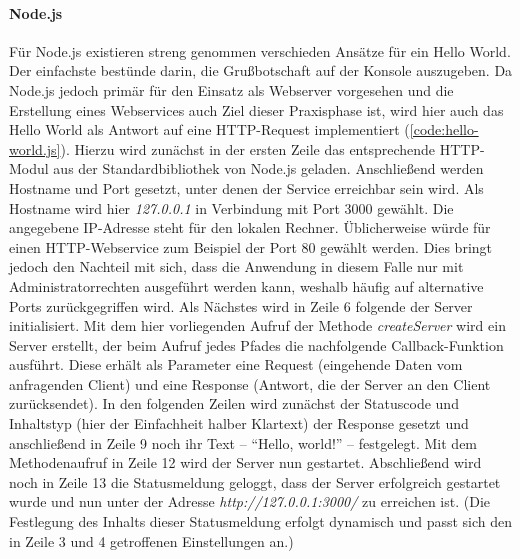 \paragraph{Node.js}
Für Node.js existieren streng genommen verschieden Ansätze für ein Hello World.
Der einfachste bestünde darin, die Grußbotschaft auf der Konsole auszugeben.
Da Node.js jedoch primär für den Einsatz als Webserver vorgesehen und die Erstellung eines Webservices auch Ziel dieser Praxisphase ist, wird hier auch das Hello World als Antwort auf eine \ac{HTTP}-Request implementiert (\autoref{code:hello-world.js}).
Hierzu wird zunächst in der ersten Zeile das entsprechende \ac{HTTP}-Modul aus der Standardbibliothek von Node.js geladen.
Anschließend werden Hostname und Port gesetzt, unter denen der Service erreichbar sein wird.
Als Hostname wird hier \emph{127.0.0.1} in Verbindung mit Port 3000 gewählt.
Die angegebene \ac{IP}-Adresse steht für den lokalen Rechner.
Üblicherweise würde für einen \ac{HTTP}-Webservice zum Beispiel der Port 80 gewählt werden.
Dies bringt jedoch den Nachteil mit sich, dass die Anwendung in diesem Falle nur mit Administratorrechten ausgeführt werden kann, weshalb häufig auf alternative Ports zurückgegriffen wird.
Als Nächstes wird in Zeile 6 folgende der Server initialisiert.
Mit dem hier vorliegenden Aufruf der Methode \emph{createServer} wird ein Server erstellt, der beim Aufruf jedes Pfades die nachfolgende Callback-Funktion ausführt.
Diese erhält als Parameter eine Request (eingehende Daten vom anfragenden Client) und eine Response (Antwort, die der Server an den Client zurücksendet).
In den folgenden Zeilen wird zunächst der Statuscode und Inhaltstyp (hier der Einfachheit halber Klartext) der Response gesetzt und anschließend in Zeile 9 noch ihr Text -- \enquote{Hello, world!} -- festgelegt.
Mit dem Methodenaufruf in Zeile 12 wird der Server nun gestartet.
Abschließend wird noch in Zeile 13 die Statusmeldung geloggt, dass der Server erfolgreich gestartet wurde und nun unter der Adresse \emph{http://127.0.0.1:3000/} zu erreichen ist.
(Die Festlegung des Inhalts dieser Statusmeldung erfolgt dynamisch und passt sich den in Zeile 3 und 4 getroffenen Einstellungen an.)



